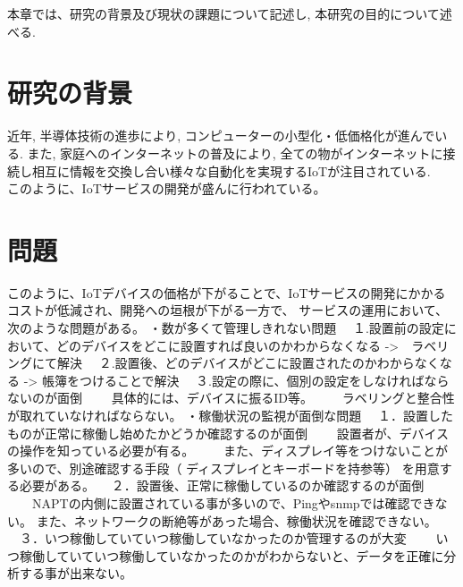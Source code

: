 本章では、研究の背景及び現状の課題について記述し, 本研究の目的について述べる.

\section{研究の背景}
近年, 半導体技術の進歩により, コンピューターの小型化・低価格化が進んでいる. 
また, 家庭へのインターネットの普及により, 全ての物がインターネットに接続し相互に情報を交換し合い様々な自動化を実現するIoTが注目されている.\\






このように、IoTサービスの開発が盛んに行われている。


\section{問題}%
このように、IoTデバイスの価格が下がることで、IoTサービスの開発にかかるコストが低減され、開発への垣根が下がる一方で、
サービスの運用において、次のような問題がある。
・数が多くて管理しきれない問題
　１.設置前の設定において、どのデバイスをどこに設置すれば良いのかわからなくなる ->　ラベリングにて解決
　２.設置後、どのデバイスがどこに設置されたのかわからなくなる -> 帳簿をつけることで解決
　３.設定の際に、個別の設定をしなければならないのが面倒
　　具体的には、デバイスに振るID等。
　　ラベリングと整合性が取れていなければならない。
・稼働状況の監視が面倒な問題
　１．設置したものが正常に稼働し始めたかどうか確認するのが面倒
　　設置者が、デバイスの操作を知っている必要が有る。
　　また、ディスプレイ等をつけないことが多いので、別途確認する手段（
		ディスプレイとキーボードを持参等）
	を用意する必要がある。
　２．設置後、正常に稼働しているのか確認するのが面倒
　　NAPTの内側に設置されている事が多いので、Pingやsnmpでは確認できない。
	また、ネットワークの断絶等があった場合、稼働状況を確認できない。
　３．いつ稼働していていつ稼働していなかったのか管理するのが大変
　　いつ稼働していていつ稼働していなかったのかがわからないと、データを正確に分析する事が出来ない。

